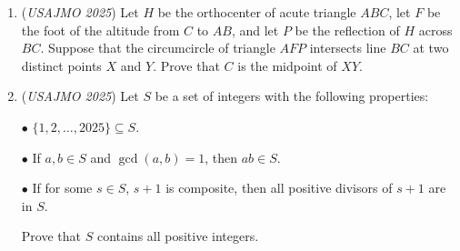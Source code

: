 \begin{enumerate}
	\item (\textit{USAJMO 2025}) Let $H$ be the orthocenter of acute triangle $ABC$, let $F$ be the foot of the altitude from $C$ to $AB$, and let $P$ be the reflection of $H$ across $BC$. Suppose that the circumcircle of triangle $AFP$ intersects line $BC$ at two distinct points $X$ and $Y$. Prove that $C$ is the midpoint of $XY$.


 

	\item (\textit{USAJMO 2025}) Let $S$ be a set of integers with the following properties:


 $\bullet$ $\{ 1, 2, \dots, 2025 \} \subseteq S$.


 $\bullet$ If $a, b \in S$ and $\gcd(a, b) = 1$, then $ab \in S$.


 $\bullet$ If for some $s \in S$, $s + 1$ is composite, then all positive divisors of $s + 1$ are in $S$.


 Prove that $S$ contains all positive integers.


 

\end{enumerate}